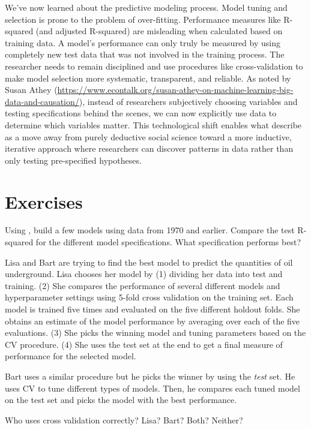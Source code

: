 We've now learned about the predictive modeling process. Model tuning and selection is prone to the problem of over-fitting. Performance measures like R-squared (and adjusted R-squared) are misleading when calculated based on training data. A model's performance can only truly be measured by using completely new test data that was not involved in the training process. The researcher needs to remain disciplined and use procedures like cross-validation to make model selection more systematic, transparent, and reliable. As noted by Susan Athey (\url{https://www.econtalk.org/susan-athey-on-machine-learning-big-data-and-causation/}), instead of researchers subjectively choosing variables and testing specifications behind the scenes, we can now explicitly use data to determine which variables matter. This technological shift enables what \cite{grimmer2021machine} describe as a move away from purely deductive social science toward a more inductive, iterative approach where researchers can discover patterns in data rather than only testing pre-specified hypotheses.

\section{Exercises}

\begin{tcolorbox}[breakable, size=fbox, boxrule=1pt, pad at break*=1mm,colback=cellbackground, colframe=cellborder, title=Exercise: Tufte Model Comparison]
Using , build a few models using data from 1970 and earlier. Compare the test R-squared for the different model specifications. What specification performs best?
\end{tcolorbox}

\begin{tcolorbox}[breakable, size=fbox, boxrule=1pt, pad at break*=1mm,colback=cellbackground, colframe=cellborder, title=Exercise: Cross-Validation Usage]
Lisa and Bart are trying to find the best model to predict the quantities of oil underground. Lisa chooses her model by (1) dividing her data into test and training. (2) She compares the performance of several different models and hyperparameter settings using 5-fold cross validation on the training set. Each model is trained five times and evaluated on the five different holdout folds. She obtains an estimate of the model performance by averaging over each of the five evaluations. (3) She picks the winning model and tuning parameters based on the CV procedure. (4) She uses the test set at the end to get a final measure of performance for the selected model.

Bart uses a similar procedure but he picks the winner by using the \textit{test} set. He uses CV to tune different types of models. Then, he compares each tuned model on the test set and picks the model with the best performance.

Who uses cross validation correctly? Lisa? Bart? Both? Neither?
\end{tcolorbox}


